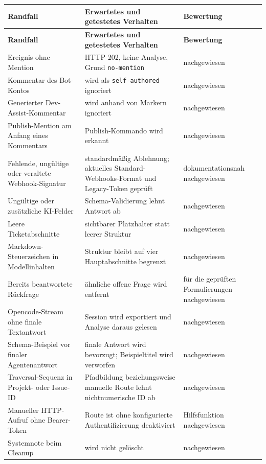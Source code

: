 \begin{longtable}{@{}>{\raggedright\arraybackslash}p{}>{\raggedright\arraybackslash}p{}>{\raggedright\arraybackslash}p{}@{}}
\toprule
\textbf{Randfall} & \textbf{Erwartetes und getestetes Verhalten} & \textbf{Bewertung} \\
\midrule
\endfirsthead
\toprule
\textbf{Randfall} & \textbf{Erwartetes und getestetes Verhalten} & \textbf{Bewertung} \\
\midrule
\endhead
Ereignis ohne Mention & HTTP 202, keine Analyse, Grund \texttt{no-mention} & nachgewiesen \\
Kommentar des Bot-Kontos & wird als \texttt{self-authored} ignoriert & nachgewiesen \\
Generierter Dev-Assist-Kommentar & wird anhand von Markern ignoriert & nachgewiesen \\
Publish-Mention am Anfang eines Kommentars & Publish-Kommando wird erkannt & nachgewiesen \\
Fehlende, ungültige oder veraltete Webhook-Signatur & standardmäßig Ablehnung; aktuelles Standard-Webhooks-Format und Legacy-Token geprüft & dokumentationsnah nachgewiesen \\
Ungültige oder zusätzliche KI-Felder & Schema-Validierung lehnt Antwort ab & nachgewiesen \\
Leere Ticketabschnitte & sichtbarer Platzhalter statt leerer Struktur & nachgewiesen \\
Markdown-Steuerzeichen in Modellinhalten & Struktur bleibt auf vier Hauptabschnitte begrenzt & nachgewiesen \\
Bereits beantwortete Rückfrage & ähnliche offene Frage wird entfernt & für die geprüften Formulierungen nachgewiesen \\
Opencode-Stream ohne finale Textantwort & Session wird exportiert und Analyse daraus gelesen & nachgewiesen \\
Schema-Beispiel vor finaler Agentenantwort & finale Antwort wird bevorzugt; Beispieltitel wird verworfen & nachgewiesen \\
Traversal-Sequenz in Projekt- oder Issue-ID & Pfadbildung beziehungsweise manuelle Route lehnt nichtnumerische ID ab & nachgewiesen \\
Manueller HTTP-Aufruf ohne Bearer-Token & Route ist ohne konfigurierte Authentifizierung deaktiviert & Hilfsfunktion nachgewiesen \\
Systemnote beim Cleanup & wird nicht gelöscht & nachgewiesen \\
\bottomrule
\end{longtable}

